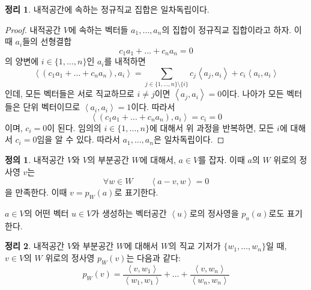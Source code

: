 \documentclass[unfonts,oneside,a4paper]{oblivoir}
\theoremstyle{definition}
\newtheorem{definition}{정의}[section]
\theoremstyle{theorem}
\newtheorem{theorem}{정리}[section]
\theoremstyle{theorem}
\theoremstyle{remark}
\theoremstyle{remark}
\theoremstyle{remark}
\theoremstyle{remark}
\renewcommand{\vec}[1]{\bm{\mathit{#1}}}
\begin{document}
\begin{theorem}
    내적공간에 속하는 정규직교 집합은 일차독립이다.
\end{theorem}

\begin{proof}
    내적공간 $V$에 속하는 벡터들 $\vec a_1, \dots, \vec a_n$의 집합이 정규직교 집합이라고 하자.
    이때 $\vec a_i$들의 선형결합
    \begin{equation*}
        c_1 \vec a_1 + \dots + c_n \vec a_n = 0
    \end{equation*}
    의 양변에 $i \in \{1, \dots, n\}$인 $\vec a_i$를 내적하면
    \begin{equation*}
        \left<(c_1 \vec a_1 + \dots + c_n \vec a_n), \vec a_i\right> = \sum_{j \in \{1, \dots, n\} \setminus \{i\}} c_j \left<\vec a_j, \vec a_i\right> + c_i \left<\vec a_i, \vec a_i\right>
    \end{equation*}
    인데, 모든 벡터들은 서로 직교하므로 $i \neq j$이면 $\left<\vec a_j, \vec a_i\right> = 0$이다.
    나아가 모든 벡터들은 단위 벡터이므로 $\left<\vec a_i, \vec a_i\right> = 1$이다.
    따라서
    \begin{equation*}
        \left<(c_1 \vec a_1 + \dots + c_n \vec a_n), \vec a_i\right> = c_i = 0
    \end{equation*}
    이며, $c_i = 0$이 된다.
    임의의 $i \in \{1, \dots, n\}$에 대해서 위 과정을 반복하면, 모든 $i$에 대해서 $c_i = 0$임을 알 수 있다.
    따라서 $\vec a_1, \dots, \vec a_n$은 일차독립이다.
\end{proof}

\begin{definition}
    내적공간 $V$와 $V$의 부분공간 $W$에 대해서, $\vec a \in V$를 잡자.
    이때 $\vec a$의 $W$ 위로의 정사영 $\vec v$는 
    \begin{equation*}
        \forall \vec w \in W \qquad \left<\vec a - \vec v, \vec w\right> = 0
    \end{equation*}
    을 만족한다.
    이때 $\vec v = p_W (\vec a)$로 표기한다.

    $\vec a \in V$의 어떤 벡터 $\vec u \in V$가 생성하는 벡터공간 $\left<\vec u\right>$로의 정사영을 $p_{\vec u} (\vec a)$로도 표기한다.
\end{definition}

\begin{theorem}
    내적공간 $V$와 부분공간 $W$에 대해서 $W$의 직교 기저가 $\{\vec w_1, \dots, \vec w_n\}$일 때, $\vec v \in V$의 $W$ 위로의 정사영 $p_W (\vec v)$는 다음과 같다:
    \begin{equation*}
        p_W (\vec v) = \frac{\left<\vec v, \vec w_1\right>}{\left<\vec w_1, \vec w_1\right>} + \dots + \frac{\left<\vec v, \vec w_n\right>}{\left<\vec w_n, \vec w_n\right>}
    \end{equation*}
\end{theorem}
\end{document}
